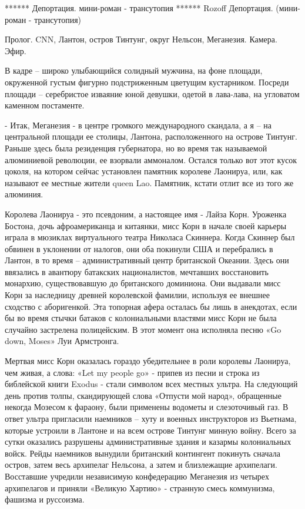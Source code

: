 ****** Депортация. мини-роман - трансутопия ******
Rozoff
Депортация. (мини-роман - трансутопия)

Пролог. CNN, Лантон, остров Тинтунг, округ Нельсон, Меганезия. Камера. Эфир.

В кадре – широко улыбающийся солидный мужчина, на фоне площади, окруженной густым фигурно подстриженным цветущим кустарником. Посреди площади – серебристое изваяние юной девушки, одетой в лава-лава, на угловатом каменном постаменте.

- Итак, Меганезия - в центре громкого международного скандала, а я – на центральной площади ее столицы, Лантона, расположенного на острове Тинтунг. Раньше здесь была резиденция губернатора, но во время так называемой алюминиевой революции, ее взорвали аммоналом. Остался только вот этот кусок цоколя, на котором сейчас установлен памятник королеве Лаонируа, или, как называют ее местные жители queen Lao. Памятник, кстати отлит все из того же алюминия.

Королева Лаонируа - это псевдоним, а настоящее имя - Лайза Корн. Уроженка Бостона, дочь афроамериканца и китаянки, мисс Корн в начале своей карьеры играла в мюзиклах виртуального театра Николаса Скиннера. Когда Скиннер был обвинен в уклонении от налогов, они оба покинули США и перебрались в Лантон, в то время – административный центр британской Океании. Здесь они ввязались в авантюру батакских националистов, мечтавших восстановить монархию, существовавшую до британского доминиона. Они выдавали мисс Корн за наследницу древней королевской фамилии, используя ее внешнее сходство с аборигенкой. Эта топорная афера осталась бы лишь в анекдотах, если бы во время стычки батаков с колониальными властями мисс Корн не была случайно застрелена полицейским. В этот момент она исполняла песню «Go down, Moses» Луи Армстронга.

Мертвая мисс Корн оказалась гораздо убедительнее в роли королевы Лаонируа, чем живая, а слова: «Let my people go» - припев из песни и строка из библейской книги Exodus - стали символом всех местных ультра. На следующий день против толпы, скандирующей слова «Отпусти мой народ», обращенные некогда Мозесом к фараону, были применены водометы и слезоточивый газ. В ответ ультра пригласили наемников – хуту и военных инструкторов из Вьетнама, которые устроили в Лантоне и на всем острове Тинтунг минную войну. Всего за сутки оказались разрушены административные здания и казармы колониальных войск. Рейды наемников вынудили британский контингент покинуть сначала остров, затем весь архипелаг Нельсона, а затем и близлежащие архипелаги. Восставшие учредили независимую конфедерацию Меганезия из четырех архипелагов и приняли «Великую Хартию» - странную смесь коммунизма, фашизма и руссоизма.

